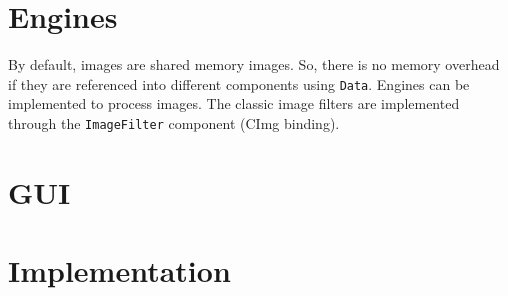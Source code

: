 \section{Engines}

\noindent By default, images are shared memory images. So, there is no memory overhead if they are referenced into different components using \texttt{Data}. Engines can be implemented to process images. The classic image filters are implemented through the \texttt{ImageFilter} component (CImg binding).

\section{GUI}


\section{Implementation}

